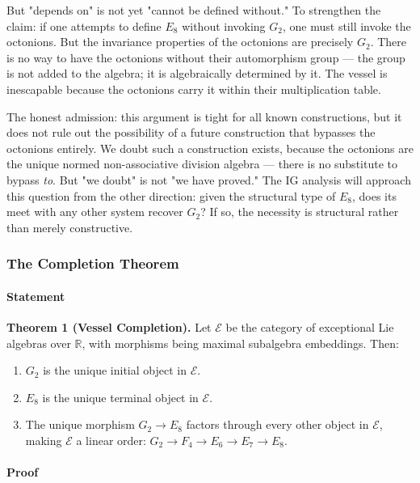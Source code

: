 \documentclass[12pt,a4paper]{article}
\begin{document}
But "depends on" is not yet "cannot be defined without." To strengthen the claim: if one attempts to define $E_8$ without invoking $G_2$, one must still invoke the octonions. But the invariance properties of the octonions are precisely $G_2$. There is no way to have the octonions without their automorphism group --- the group is not added to the algebra; it is algebraically determined by it. The vessel is inescapable because the octonions carry it within their multiplication table.

The honest admission: this argument is tight for all known constructions, but it does not rule out the possibility of a future construction that bypasses the octonions entirely. We doubt such a construction exists, because the octonions are the unique normed non-associative division algebra --- there is no substitute to bypass \emph{to}. But "we doubt" is not "we have proved." The IG analysis will approach this question from the other direction: given the structural type of $E_8$, does its meet with any other system recover $G_2$? If so, the necessity is structural rather than merely constructive.

\subsubsection{The Completion Theorem}

\paragraph{Statement}

\textbf{Theorem 1 (Vessel Completion).} Let $\mathcal{E}$ be the category of exceptional Lie algebras over $\mathbb{R}$, with morphisms being maximal subalgebra embeddings. Then:

\begin{enumerate}
    \item $G_2$ is the unique initial object in $\mathcal{E}$.
    \item $E_8$ is the unique terminal object in $\mathcal{E}$.
    \item The unique morphism $G_2 \to E_8$ factors through every other object in $\mathcal{E}$, making $\mathcal{E}$ a linear order: $G_2 \to F_4 \to E_6 \to E_7 \to E_8$.
\end{enumerate}

\paragraph{Proof}
\end{document}
